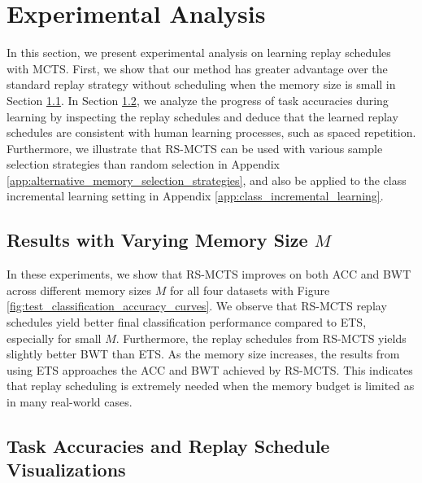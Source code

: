 

\section{Experimental Analysis}\label{app:experimental_analysis}

In this section, we present experimental analysis on learning replay schedules with MCTS. First, we show that our method has greater advantage over the standard replay strategy without scheduling when the memory size is small in Section \ref{app:results_with_varying_memory_size}. In Section \ref{app:task_accuracies_and_replay_schedule_visualization}, we analyze the progress of task accuracies during learning by inspecting the replay schedules and deduce that the learned replay schedules are consistent with human learning processes, such as spaced repetition. Furthermore, we illustrate that RS-MCTS can be used with various sample selection strategies than random selection in Appendix \ref{app:alternative_memory_selection_strategies}, and also be applied to the class incremental learning setting in Appendix \ref{app:class_incremental_learning}.

\subsection{Results with Varying Memory Size $M$}\label{app:results_with_varying_memory_size}

In these experiments, we show that RS-MCTS improves on both ACC and BWT across different memory sizes $M$ for all four datasets with Figure \ref{fig:test_classification_accuracy_curves}.
We observe that RS-MCTS replay schedules yield better final classification performance compared to ETS, especially for small $M$. Furthermore, the replay schedules from RS-MCTS yields slightly better BWT than ETS. 
As the memory size increases, the results from using ETS approaches the ACC and BWT achieved by RS-MCTS. This indicates that replay scheduling is extremely needed when the memory budget is limited as in many real-world cases. 



\subsection{Task Accuracies and Replay Schedule Visualizations}\label{app:task_accuracies_and_replay_schedule_visualization}

